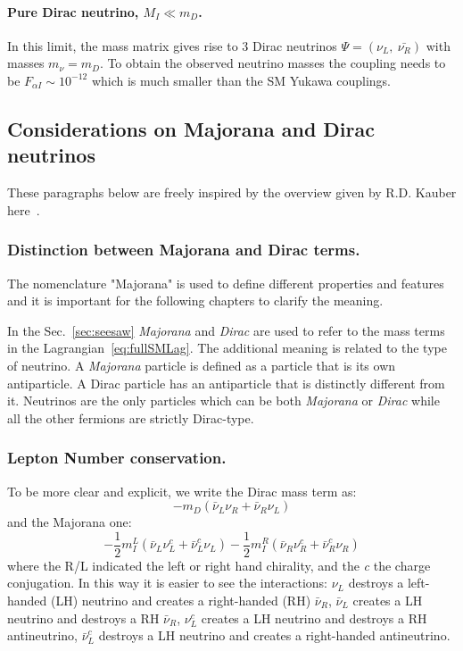 \paragraph {Pure Dirac neutrino, $M_I \ll m_D$.}
In this limit, the mass matrix gives rise to 3 Dirac neutrinos $\Psi = (\nu_L,\:\bar{\nu_R})$ with masses $m_\nu = m_D$. To obtain the observed neutrino masses the coupling needs to be $F_{\alpha I} \sim 10^{-12}$ which is much smaller than the SM Yukawa couplings.

\vspace{5mm} 
\subsection{Considerations on Majorana and Dirac neutrinos}
These paragraphs below are freely inspired by the overview given by R.D. Kauber here~\cite{webpage_seesaw}.
\subsubsection {Distinction between Majorana and Dirac terms.}\label{sec:majo_dirac}
The nomenclature "Majorana" is used to define different properties and features and it is important for the following chapters to clarify the meaning.

In the Sec.~\ref{sec:seesaw} \emph{Majorana} and \emph{Dirac} are used to refer to the mass terms in the Lagrangian~\ref{eq:fullSMLag}. The additional meaning is related to the type of neutrino. A \emph{Majorana} particle is defined as a particle that is its own antiparticle.  A Dirac particle has an antiparticle that is distinctly different from it. Neutrinos are the only particles which can be both \emph{Majorana} or \emph{Dirac} while all the other fermions are strictly Dirac-type. 

\subsubsection{Lepton Number conservation.}\label{sec:lnv_lnc}
To be more clear and explicit, we write the Dirac mass term as:
\begin{equation}
\label{eq:dirac}
-m_D (\bar{\nu}_L\nu_R + \bar{\nu}_R\nu_L)
\end{equation}
and the Majorana one:
\begin{equation}
\label{eq:majorana}
-\frac{1}{2}m^{L}_{I}(\bar{\nu}_L\nu^{c}_L + \bar{\nu}_L^{c}\nu_L) -\frac{1}{2}m^{R}_{I} (\bar{\nu}_R\nu^{c}_R + \bar{\nu}_R^{c}\nu_R)
\end{equation}
where the R/L indicated the left or right hand chirality, and the \emph{c} the charge conjugation.
In this way it is easier to see the interactions: $\nu_L$ destroys a left-handed (LH) neutrino and creates a right-handed (RH) $\bar{\nu}_R$, $\bar{\nu}_L$
 creates a LH neutrino and destroys a RH $\bar{\nu}_R$, $\nu^{c}_L$ creates a LH neutrino and destroys a RH antineutrino, $\bar{\nu}^{c}_L$ destroys a LH
 neutrino and creates a right-handed antineutrino.

